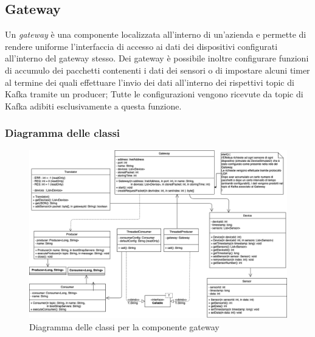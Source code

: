 \subsection{Gateway}
Un \textit{gateway} è una componente localizzata all'interno di un'azienda e permette di rendere uniforme l'interfaccia di accesso ai dati dei dispositivi configurati all'interno del gateway stesso.
Dei gateway è possibile inoltre configurare funzioni di accumulo dei pacchetti contenenti i dati dei sensori o di impostare alcuni timer al termine dei quali effettuare l'invio dei dati all'interno dei rispettivi topic di Kafka tramite un producer;
Tutte le configurazioni vengono ricevute da topic di Kafka adibiti esclusivamente a questa funzione.
			\begin{landscape}
			\subsubsection{Diagramma delle classi}
		  	\begin{figure}[H]
				\centering
				\includegraphics[scale=0.500]{res/images/GATEWAY/ClassiGateway.png}
				\caption{Diagramma delle classi per la componente gateway}
			\end{figure}	
			\end{landscape}
